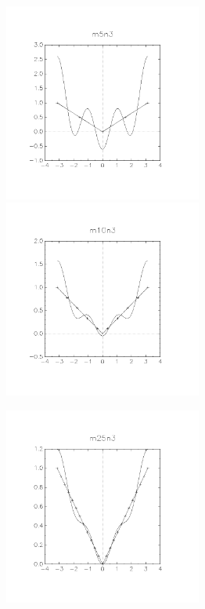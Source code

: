 \documentclass[11pt, a4paper, titlepage, openright]{article}
\begin{document}
    \begin{figure}[H]
        \begin{minipage}[b]{0.49\textwidth}
            \includegraphics[width=6.5cm, trim={2cm, 4cm, 2cm, 3cm}, clip]{../absImages/m5n3}
        \end{minipage}
        \hfill
        \begin{minipage}[b]{0.49\textwidth}
            \includegraphics[width=6.5cm, trim={2cm, 4cm, 2cm, 3cm}, clip]{../absImages/m10n3}
        \end{minipage}
    \end{figure}
    \begin{figure}[H]
        \begin{minipage}[b]{0.49\textwidth}
            \includegraphics[width=6.5cm, trim={2cm, 4cm, 2cm, 3cm}, clip]{../absImages/m25n3}
        \end{minipage}
        \hfill
    \end{figure}
\end{document}
